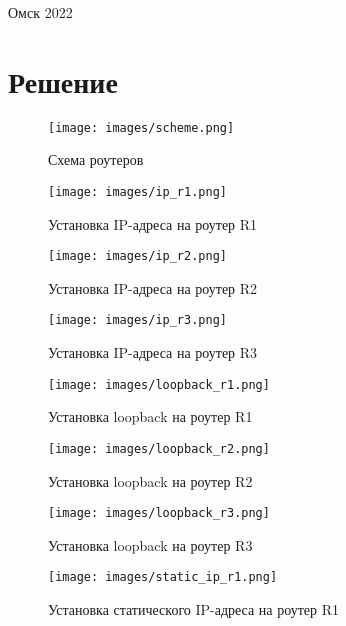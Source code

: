 \documentclass[14pt, a4paper]{article}
\begin{document}
    \vspace*{\fill}
    \begin{center}
        Омск 2022
    \end{center}

    \newpage

    \section*{Решение}

    \begin{figure}[H]
        \centering
        \texttt{[image: images/scheme.png]}
        \caption{Схема роутеров}
    \end{figure}

    \begin{figure}[H]
        \centering
        \texttt{[image: images/ip\_r1.png]}
        \caption{Установка IP-адреса на роутер R1}
    \end{figure}

    \begin{figure}[H]
        \centering
        \texttt{[image: images/ip\_r2.png]}
        \caption{Установка IP-адреса на роутер R2}
    \end{figure}

    \begin{figure}[H]
        \centering
        \texttt{[image: images/ip\_r3.png]}
        \caption{Установка IP-адреса на роутер R3}
    \end{figure}

    \begin{figure}[H]
        \centering
        \texttt{[image: images/loopback\_r1.png]}
        \caption{Установка loopback на роутер R1}
    \end{figure}

    \begin{figure}[H]
        \centering
        \texttt{[image: images/loopback\_r2.png]}
        \caption{Установка loopback на роутер R2}
    \end{figure}

    \begin{figure}[H]
        \centering
        \texttt{[image: images/loopback\_r3.png]}
        \caption{Установка loopback на роутер R3}
    \end{figure}

    \begin{figure}[H]
        \centering
        \texttt{[image: images/static\_ip\_r1.png]}
        \caption{Установка статического IP-адреса на роутер R1}
    \end{figure}
\end{document}
